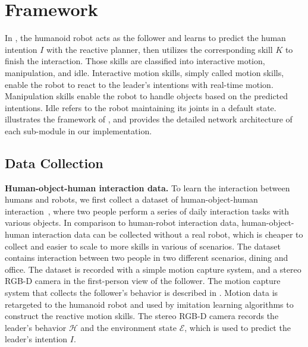 \section{\our Framework}
In \our, the humanoid robot acts as the follower and learns to predict the human intention $I$ with the reactive planner, then utilizes the corresponding skill $K$ to finish the interaction.
Those skills are classified into interactive motion, manipulation, and idle. 
Interactive motion skills, simply called motion skills, enable the robot to react to the leader's intentions with real-time motion. 
Manipulation skills enable the robot to handle objects based on the predicted intentions. 
Idle refers to the robot maintaining its joints in a default state.
 illustrates the framework of \our, and  provides the detailed network architecture of each sub-module in our implementation.



\subsection{Data Collection}
\noindent\textbf{Human-object-human interaction data.}
To learn the interaction between humans and robots, we first collect a dataset of human-object-human interaction~\cite{zhang2024core4d}, where two people perform a series of daily interaction tasks with various objects.
In comparison to human-robot interaction data, human-object-human interaction data can be collected without a real robot, which is cheaper to collect and easier to scale to more skills in various of scenarios.
The dataset contains interaction between two people in two different scenarios, dining and office. 
The dataset is recorded with a simple motion capture system, and a stereo RGB-D camera in the first-person view of the follower. 
The motion capture system that collects the follower's behavior is described in .
Motion data is retargeted to the humanoid robot and used by imitation learning algorithms to construct the reactive motion skills.
The stereo RGB-D camera records the leader's behavior $\mathcal{H}$ and the environment state $\mathcal{E}$, which is used to predict the leader's intention $I$.


